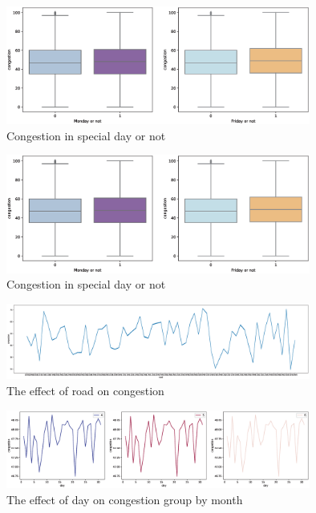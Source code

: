 \begin{center}
	
	\begin{figure}[htp]
	\setlength{\abovecaptionskip}{0.1cm} 
	\raggedleft
	\includegraphics[width=10cm]{figure/is_weekend.eps}
	\centering
	\caption{Congestion in special day or not}
	\label{special}
	\end{figure}
\end{center}

\begin{center}
	\begin{figure}[htp]
		\setlength{\abovecaptionskip}{0.1cm} 
		\raggedleft
		\includegraphics[width=10cm]{figure/is_weekend.eps}
		\centering
		\caption{Congestion in special day or not}
		\label{special}
	\end{figure}
\end{center}

\begin{center}
	
	\begin{figure}
		\setlength{\abovecaptionskip}{0.1cm} 
		\raggedleft
		\includegraphics[width=10.0cm]{figure/road1.eps}
		\centering
		\caption{The effect of road on congestion}
		\label{road}
	\end{figure}
\end{center}

\begin{center}
	\begin{figure}
		\setlength{\abovecaptionskip}{0.1cm} 
		\includegraphics[width=10.0cm]{figure/day.eps}
		\caption{The effect of day on congestion group by month}
		\label{day}
	\end{figure}
\end{center}

